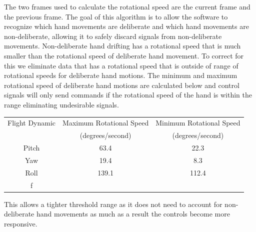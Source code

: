 \documentclass[letterpaper,english, 12pt]{article}
\begin{document}
The two frames used to calculate the rotational speed are the current frame and the previous frame. The goal of this algorithm is to allow the software to recognize which hand movements are deliberate and which hand movements are non-deliberate, allowing it to safely discard signals from non-deliberate movements. Non-deliberate hand drifting has a rotational speed that is much smaller than the rotational speed of deliberate hand movement. To correct for this we eliminate data that has a rotational speed that is outside of range of rotational speeds for deliberate hand motions.
The minimum and maximum rotational speed of deliberate hand motions are calculated below and control signals will only send commands if the rotational speed of the hand is within the range eliminating undesirable signals.

\begin{center}
	\begin{tabular}{|c|c|c|}
		\hline
			Flight Dynamic & Maximum Rotational Speed & Minimum Rotational Speed \\
			 & (degrees/second) & (degrees/second) \\
		\hline
			Pitch & 63.4 & 22.3 \\
		\hline
			Yaw & 19.4 & 8.3 \\
		\hline
			Roll & 139.1 & 112.4 \\f
		\hline
	\end{tabular}
\end{center}

This allows a tighter threshold range as it does not need to account for non-deliberate hand movements as much as a result the controls become more responsive.
\end{document}

